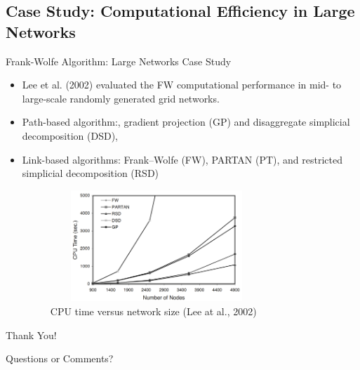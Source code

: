 \documentclass{beamer}
\begin{document}
\subsection{Case Study: Computational Efficiency in Large Networks}
\begin{frame}{Frank-Wolfe Algorithm: Large Networks Case Study}
\begin{itemize}
	\item  Lee et al. (2002) evaluated the FW computational performance in mid- to large-scale randomly generated grid networks.
	\item Path-based algorithm:, gradient projection (GP) and disaggregate simplicial decomposition (DSD), 
	\item Link-based algorithms: Frank–Wolfe (FW), PARTAN (PT), and restricted simplicial decomposition (RSD)
	\begin{figure}
		\includegraphics[width=8cm, height=4.2cm]{Fig/ComputationalTime.png}
		\caption{CPU time versus network size (Lee at al., 2002)}
	\end{figure}
\end{itemize}

\end{frame}	
	\begin{frame}{}
		\Huge{\centerline{Thank You!}}
		\vspace{5mm}
		\small\centerline{Questions or Comments?}
	\end{frame}
\end{document}
